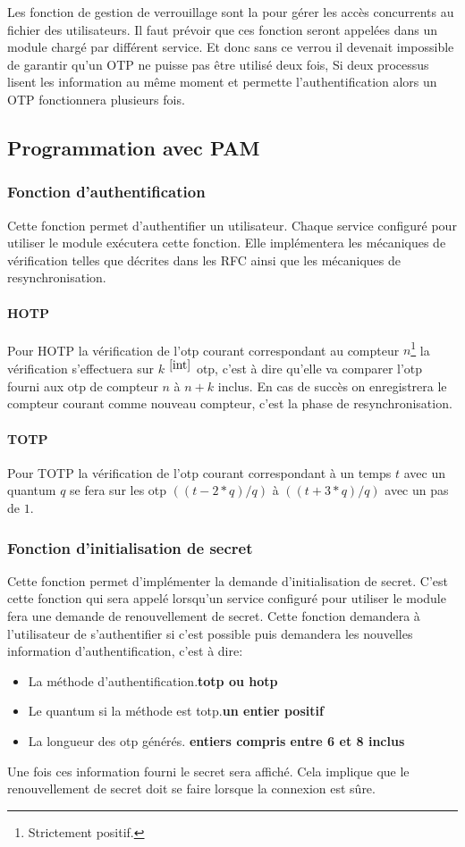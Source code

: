 Les fonction de gestion de verrouillage sont la pour gérer les accès concurrents 
au fichier des utilisateurs. Il faut prévoir que ces fonction seront appelées 
dans un module chargé par différent service. Et donc sans ce verrou il devenait 
impossible de garantir qu'un OTP ne puisse pas être utilisé deux fois, Si deux 
processus lisent les information au même moment et permette l'authentification 
alors un OTP fonctionnera plusieurs fois.

\subsection{Programmation avec PAM}
\subsubsection{Fonction d'authentification}
Cette fonction permet d'authentifier un utilisateur. Chaque service configuré
pour utiliser le module exécutera cette fonction. Elle implémentera les 
mécaniques de vérification telles que décrites dans les RFC ainsi que les 
mécaniques de resynchronisation.
\paragraph{HOTP}
Pour HOTP la vérification de l'otp courant correspondant au compteur 
$n$\footnote{Strictement positif.\label{int}} la vérification s'effectuera sur 
$k$ $^{\ref{int}}$ otp, c'est à dire qu'elle va comparer l'otp fourni aux otp de 
compteur $n$ à $n+k$ inclus. En cas de succès on enregistrera le compteur 
courant comme nouveau compteur, c'est la phase de resynchronisation.
\paragraph{TOTP}
Pour TOTP la vérification de l'otp courant correspondant à un temps $t$ avec un 
quantum $q$ se fera sur les otp $((t - 2 * q) / q) $ à $((t + 3 * q) / q) $ avec un 
pas de $1$.
\subsubsection{Fonction d'initialisation de secret}
Cette fonction permet d'implémenter la demande d'initialisation de secret.
C'est cette fonction qui sera appelé lorsqu'un service configuré pour utiliser
le module fera une demande de renouvellement de secret. Cette fonction demandera
à l'utilisateur de s'authentifier si c'est possible puis demandera les nouvelles
information d'authentification, c'est à dire:
\begin{itemize}
  \item La méthode d'authentification.\hfill\textbf{totp ou hotp}
  \item Le quantum si la méthode est totp.\hfill \textbf{un entier positif}
  \item La longueur des otp générés.
  \hfill\textbf{entiers compris entre 6 et 8 inclus}
\end{itemize}
Une fois ces information fourni le secret sera affiché. Cela implique que le 
renouvellement de secret doit se faire lorsque la connexion est sûre.

